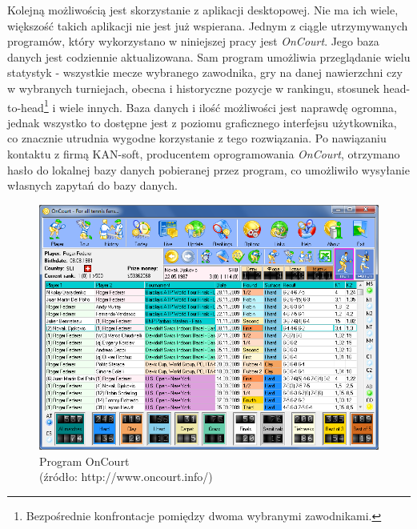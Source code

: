 Kolejną możliwością jest skorzystanie z aplikacji desktopowej. Nie ma ich wiele, większość takich aplikacji nie jest już wspierana. Jednym z ciągle utrzymywanych programów, który wykorzystano w niniejszej pracy jest \textit{OnCourt}. Jego baza danych jest codziennie aktualizowana. Sam program umożliwia przeglądanie wielu statystyk - wszystkie mecze wybranego zawodnika, gry na danej nawierzchni czy w wybranych turniejach, obecna i historyczne pozycje w rankingu, stosunek head-to-head\footnote{Bezpośrednie konfrontacje pomiędzy dwoma wybranymi zawodnikami.} i wiele innych. Baza danych i ilość możliwości jest naprawdę ogromna, jednak wszystko to dostępne jest z poziomu graficznego interfejsu użytkownika, co znacznie utrudnia wygodne korzystanie z tego rozwiązania. Po nawiązaniu kontaktu z firmą KAN-soft, producentem oprogramowania \textit{OnCourt}, otrzymano hasło do lokalnej bazy danych pobieranej przez program, co umożliwiło wysyłanie własnych zapytań do bazy danych.
\begin{figure}
\includegraphics[width=\textwidth]{oncourt1.png}
\caption{Program OnCourt \\ (źródło: http://www.oncourt.info/)}
\label{fig:oncourt1}
\end{figure}

